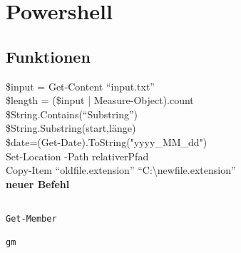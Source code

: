 \chapter{Powershell}\label{chap:Powershell}
\section{Funktionen}
\$input = Get-Content \enquote{input.txt}\\
\$length = (\$input | Measure-Object).count\\
\$String.Contains(\enquote{Substring})\\
\$String.Substring(start,länge)\\
\$date=(Get-Date).ToString("yyyy\_MM\_dd")\\
Set-Location -Path relativerPfad\\
Copy-Item \enquote{oldfile.extension} \enquote{C:\textbackslash newfile.extension}\\

\textbf{neuer Befehl}\begin{lstlisting}

Get-Member

gm

\end{lstlisting}